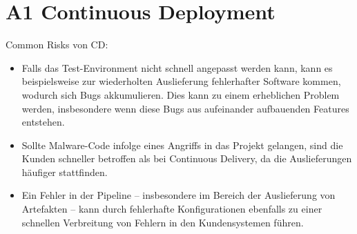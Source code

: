 \documentclass[12pt]{article}
\begin{document}
\section*{A1 Continuous Deployment}

Common Risks von CD: 

\begin{itemize}

\item Falls das Test-Environment nicht schnell angepasst werden kann, kann es beispielsweise zur wiederholten Auslieferung fehlerhafter Software kommen, wodurch sich Bugs akkumulieren. Dies kann zu einem erheblichen Problem werden, insbesondere wenn diese Bugs aus aufeinander aufbauenden Features entstehen.

\item Sollte Malware-Code infolge eines Angriffs in das Projekt gelangen, sind die Kunden schneller betroffen als bei Continuous Delivery, da die Auslieferungen häufiger stattfinden.

\item Ein Fehler in der Pipeline – insbesondere im Bereich der Auslieferung von Artefakten – kann durch fehlerhafte Konfigurationen ebenfalls zu einer schnellen Verbreitung von Fehlern in den Kundensystemen führen.

\end{itemize}
\end{document}
